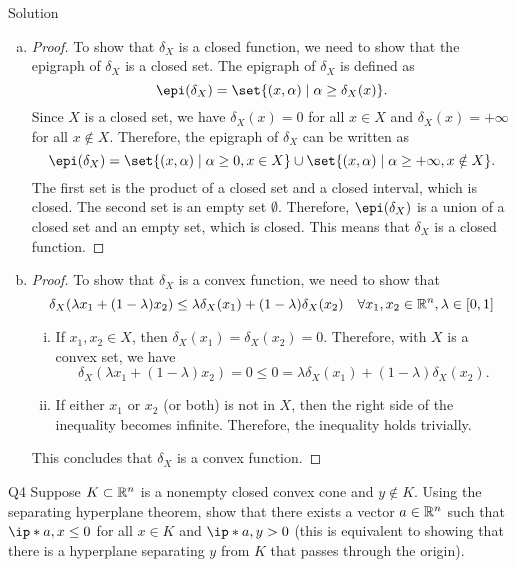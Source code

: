 \documentclass{article}
\begin{document}
\begin{solution}
    {Solution}
    \begin{enumerate}[(a)]
        \item {
            \begin{proof}
                To show that $\delta_X$ is a closed function, we need to show that the epigraph of $\delta_X$ is a closed set. The epigraph of $\delta_X$ is defined as
                \[
                    \epi(\delta_X) = \set{(x, \alpha) \mid \alpha \geq \delta_X(x)}.
                \]
                Since $X$ is a closed set, we have $\delta_X(x)=0$ for all $x\in X$ and $\delta_X(x)=+\infty$ for all $x\notin X$. Therefore, the epigraph of $\delta_X$ can be written as
                \[
                    \epi(\delta_X) = \set{(x, \alpha) \mid \alpha \geq 0, x\in X} \cup \set{(x, \alpha) \mid \alpha \geq +\infty, x\notin X}.
                \]
                The first set is the product of a closed set and a closed interval, which is closed. The second set is an empty set $\emptyset$. Therefore, $\epi(\delta_X)$ is a union of a closed set and an empty set, which is closed. This means that $\delta_X$ is a closed function.
            \end{proof}
        }
        \item {
            \begin{proof}
                To show that $\delta_X$ is a convex function, we need to show that \[\delta_X(\lambda x_1+(1-\lambda)x_2)\leq\lambda\delta_X(x_1)+(1-\lambda)\delta_X(x_2) \quad \forall x_1, x_2\in \mathbb{R}^n, \lambda\in[0,1]\]
                \begin{enumerate}[(i)]
                    \item If $x_1, x_2\in X$, then $\delta_X(x_1)=\delta_X(x_2)=0$. Therefore, with $X$ is a convex set, we have \[\delta_X(\lambda x_1+(1-\lambda)x_2)=0\leq 0=\lambda\delta_X(x_1)+(1-\lambda)\delta_X(x_2).\]
                    \item If either $x_1$ or $x_2$ (or both) is not in $X$, then the right side of the inequality becomes infinite. Therefore, the inequality holds trivially.
                \end{enumerate}
                This concludes that $\delta_X$ is a convex function.
            \end{proof}
        }
    \end{enumerate}
\end{solution}

\begin{problem}
    {Q4}
    Suppose $K\subset\mathbb{R}^n$ is a nonempty closed convex cone and $y\notin K$. Using the separating hyperplane theorem, show that there exists a vector $a\in \mathbb{R}^n$ such that $\ip*{a,x}\leq 0$ for all $x\in K$ and $\ip*{a,y}>0$ (this is equivalent to showing that there is a hyperplane separating $y$ from $K$ that passes through the origin).
\end{problem}
\end{document}
